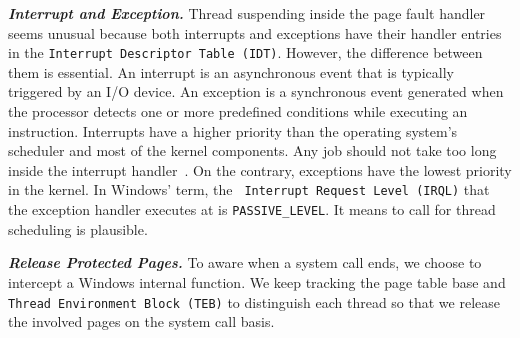 


\textbf{\textit{Interrupt and Exception.}} Thread suspending inside the page fault handler seems unusual because both interrupts and exceptions have their handler entries in the \texttt{Interrupt Descriptor Table (IDT)}. However, the difference between them is essential.  An interrupt is an asynchronous event that is typically triggered by an I/O device. An exception is a synchronous event generated when the processor detects one or more predefined conditions while executing an instruction. Interrupts have a higher priority than the operating system's scheduler and most of the kernel components. Any job should not take too long inside the interrupt handler~\cite{msdnwatchdog}.  On the contrary, exceptions have the lowest priority in the kernel. In Windows' term, the \texttt{ Interrupt Request Level (IRQL)} that the exception handler executes at is \texttt{PASSIVE\_LEVEL}. It means to call for thread scheduling is plausible.






\textbf{\textit{Release Protected Pages.}} To aware when a system call ends, we choose to intercept a Windows internal function. We keep tracking the page table base and \texttt{Thread Environment Block (TEB)} to distinguish each thread so that we release the involved pages on the system call basis.  



